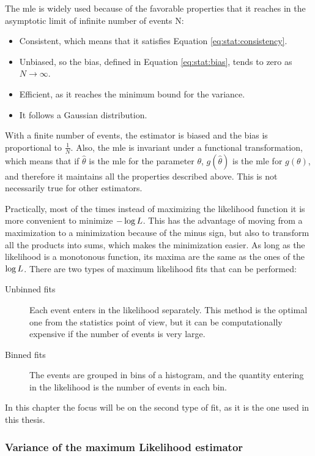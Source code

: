 The \gls{mle} is widely used because of the favorable properties that it reaches in the asymptotic limit of infinite number of events N:
\begin{itemize}
\item Consistent, which means that it satisfies Equation \ref{eq:stat:consistency}.
\item Unbiased, so the bias, defined in Equation \ref{eq:stat:bias}, tends to zero as $N \rightarrow \infty$.
\item Efficient, as it reaches the minimum bound for the variance.
\item It follows a Gaussian distribution.
\end{itemize}

\noindent With a finite number of events, the estimator is biased and the bias is proportional to $\frac{1}{N}$. Also, the \gls{mle} is invariant under a functional transformation, which means that if $\hat{\theta}$ is the \gls{mle} for the parameter $\theta$, $g(\hat{\theta})$ is the \gls{mle} for $g(\theta)$, and therefore it maintains all the properties described above. This is not necessarily true for other estimators.

Practically, most of the times instead of maximizing the likelihood function it is more convenient to minimize $-\log{L}$. This has the advantage of moving from a maximization to a minimization because of the minus sign, but also to transform all the products into sums, which makes the minimization easier. As long as the likelihood is a monotonous function, its maxima are the same as the ones of the $\log{L}$.
There are two types of maximum likelihood fits that can be performed:

\begin{description}
\item[Unbinned fits] Each event enters in the likelihood separately. This method is the optimal one from the statistics point of view, but it can be computationally expensive if the number of events is very large.
\item[Binned fits] The events are grouped in bins of a histogram, and the quantity entering in the likelihood is the number of events in each bin.
\end{description}

\noindent In this chapter the focus will be on the second type of fit, as it is the one used in this thesis.

\subsubsection*{Variance of the maximum Likelihood estimator}

